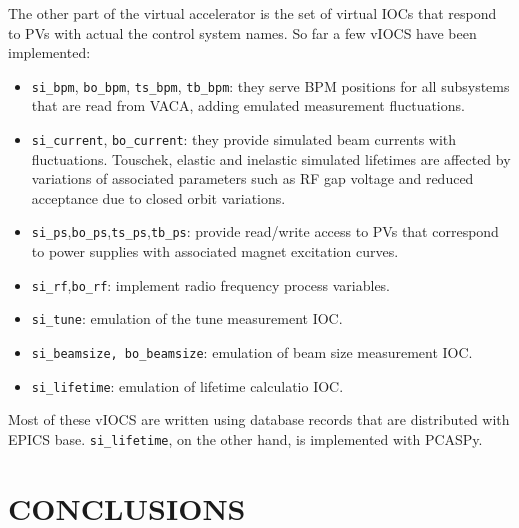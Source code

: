 \documentclass[a4paper,
              ]{jacow}
\begin{document}
The other part of the virtual accelerator is the set of virtual IOCs that respond to PVs with actual the control system names.
So far a few vIOCS have been implemented:
\begin{itemize}
\item \verb|si_bpm|, \verb|bo_bpm|, \verb|ts_bpm|, \verb|tb_bpm|: they serve BPM positions for all subsystems that are read from VACA, adding emulated measurement fluctuations.
\item \verb|si_current|, \verb|bo_current|: they provide simulated beam currents with fluctuations. Touschek, elastic and inelastic simulated lifetimes are affected by variations of associated parameters such as RF gap voltage and reduced acceptance due to closed orbit variations.
\item \verb|si_ps|,\verb|bo_ps|,\verb|ts_ps|,\verb|tb_ps|: provide read/write access to PVs that correspond to power supplies with associated magnet excitation curves.
\item \verb|si_rf|,\verb|bo_rf|: implement radio frequency process variables.
\item \verb|si_tune|: emulation of the tune measurement IOC.
\item \verb|si_beamsize, bo_beamsize|: emulation of beam size measurement IOC.
\item \verb|si_lifetime|: emulation of lifetime calculatio IOC.
\end{itemize}
Most of these vIOCS are written using database records that are distributed with EPICS base.
\verb|si_lifetime|, on the other hand, is implemented with PCASPy.

\section{CONCLUSIONS}
\end{document}
